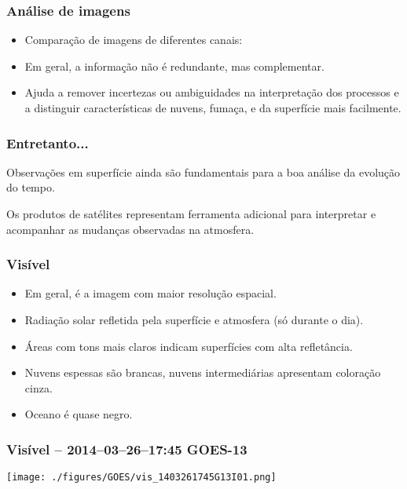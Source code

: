 \begin{frame}
\frametitle{Análise de imagens}
  \begin{itemize}[<+-| alert@+>]
    \item Comparação de imagens de diferentes canais:
    \item Em geral, a informação não é redundante, mas complementar.
    \item Ajuda a remover incertezas ou ambiguidades na interpretação dos
          processos e a distinguir características de nuvens, fumaça, e da
          superfície mais facilmente.
  \end{itemize}
\end{frame}


\begin{frame}
\frametitle{Entretanto...}
  \begin{block}{}
    Observações em superfície ainda são fundamentais para a boa análise da evolução do tempo.
  \end{block}
  \pause
  \begin{block}{}
    Os produtos de satélites representam ferramenta adicional para interpretar
    e acompanhar as mudanças observadas na atmosfera.
  \end{block}
\end{frame}


\begin{frame}
\frametitle{Visível}
  \begin{itemize}[<+-| alert@+>]
    \item Em geral, é a imagem com maior resolução espacial.
    \item Radiação solar refletida pela superfície e atmosfera (só durante o
          dia).
    \item Áreas com tons mais claros indicam superfícies com alta refletância.
    \item Nuvens espessas são brancas, nuvens intermediárias apresentam
          coloração cinza.
    \item Oceano é quase negro.
  \end{itemize}
\end{frame}


\begin{frame}
\frametitle{Visível -- 2014--03--26--17:45 GOES-13}
  \begin{center}
    \texttt{[image: ./figures/GOES/vis\_1403261745G13I01.png]}
  \end{center}
\end{frame}


